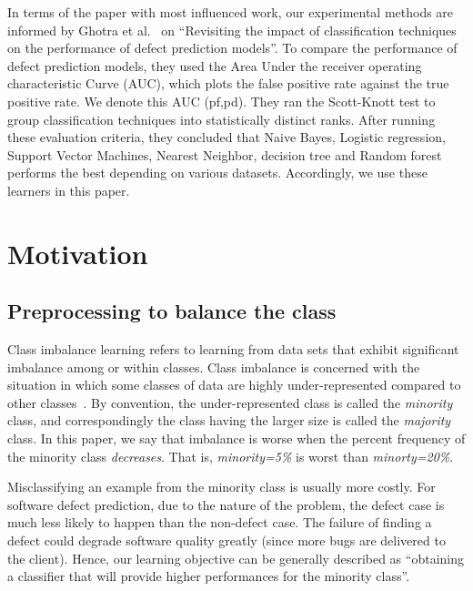 \documentclass[sigconf,review, anonymous]{acmart}
\theoremstyle{break}
\begin{document}
In terms of the paper with most influenced work,
our experimental methods are informed 
by  Ghotra et al.~\cite{ghotra2015revisiting} on ``Revisiting the impact of classification techniques on the performance of defect prediction models''. To 
compare  the  performance  of  defect prediction  models,  they  used  the  Area  Under  the receiver operating characteristic Curve (AUC), which plots  the  false  positive  rate  against  the  true  positive rate. We denote this AUC (pf,pd). 
They ran the Scott-Knott test to group classification techniques into statistically distinct ranks. After running these evaluation criteria, they concluded that Naive Bayes, Logistic regression, Support Vector Machines, Nearest Neighbor, decision tree and Random forest performs the best depending on various datasets. Accordingly, 
we use these learners in this paper.

\section{Motivation}
\subsection{Preprocessing to balance the class}
\label{sect:motivation}

Class imbalance learning refers to learning from data sets that exhibit significant imbalance among or within classes. Class imbalance  is concerned with the situation in which some classes of data are
highly under-represented compared to other classes~\cite{he2009learning}. By convention,
the under-represented class is called the {\em minority} class,
and correspondingly the class having the larger size is called the
{\em majority} class. In this paper, we say that imbalance is worse when the percent frequency of
the minority class {\em decreases}. That is,
{\em minority=5\%} is worst than {\em minorty=20\%}.

Misclassifying an example from the minority class is usually more costly. For software defect prediction, due to the nature of the problem, the defect case is much less likely to happen than the non-defect case.  The failure of finding a defect could degrade software quality greatly (since more bugs
are delivered to the client). Hence,
our learning objective can be generally described
as ``obtaining a classifier that will provide higher performances for the minority class''.
\end{document}
